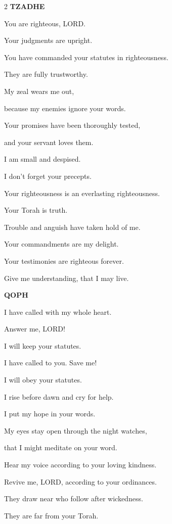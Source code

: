 \begin{multicols}{2}
	\vspace{\baselineskip}
	\textbf{TZADHE}
	
	
	\myverse{}You are righteous, LORD.
	
	Your judgments are upright.
	
	
	\myverse{}You have commanded your statutes in righteousness.
	
	They are fully trustworthy.
	
	
	\myverse{}My zeal wears me out,
	
	because my enemies ignore your words.
	
	
	\myverse{}Your promises have been thoroughly tested,
	
	and your servant loves them.
	
	
	\myverse{}I am small and despised.
	
	I don’t forget your precepts.
	
	
	\myverse{}Your righteousness is an everlasting righteousness.
	
	Your Torah is truth.
	
	
	\myverse{}Trouble and anguish have taken hold of me.
	
	Your commandments are my delight.
	
	
	\myverse{}Your testimonies are righteous forever.
	
	Give me understanding, that I may live.
	
	\vspace{\baselineskip}
	\textbf{QOPH}
	
	
	\myverse{}I have called with my whole heart.
	
	Answer me, LORD!
	
	I will keep your statutes.
	
	
	\myverse{}I have called to you. Save me!
	
	I will obey your statutes.
	
	
	\myverse{}I rise before dawn and cry for help.
	
	I put my hope in your words.
	
	
	\myverse{}My eyes stay open through the night watches,
	
	that I might meditate on your word.
	
	
	\myverse{}Hear my voice according to your loving kindness.
	
	Revive me, LORD, according to your ordinances.
	
	
	\myverse{}They draw near who follow after wickedness.
	
	They are far from your Torah.
	

\end{multicols}
